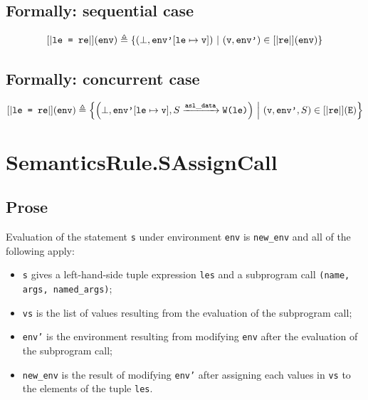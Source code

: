 \documentclass{book}
\begin{document}
\begin{formal}
  \subsection{Formally: sequential case}
  \begin{align}
    \left[| \texttt{le = re} \right|] (\texttt{env}) \triangleq
      \left\{ \left(\bot, \texttt{env'}[\texttt{le} \mapsto \texttt{v} ]\right) \ \middle|\ {} (\texttt{v}, \texttt{env'}) \in \left[| \texttt{re} \right|] (\texttt{env}) \right\}
    \label{eq:sem-seq-sassign}
  \end{align}

  \subsection{Formally: concurrent case}
  \begin{align}
    \left[| \texttt{le = re} \right|] (\texttt{env}) \triangleq
      \left\{ \left(\bot, \texttt{env'}[\texttt{le} \mapsto \texttt{v} ], S \xrightarrow{\mathtt{asl\_data}} \texttt{W(le)}\right) \ \middle|\ {}
        (\texttt{v}, \texttt{env'}, S) \in \left[| \texttt{re} \right|] (\texttt{E})
      \right\}
    \label{eq:sem-conc-sassign}
  \end{align}
\end{formal}


\section{SemanticsRule.SAssignCall \label{sec:SemanticsRule.SAssignCall}}

    \subsection{Prose}
  Evaluation of the statement \texttt{s} under environment \texttt{env} is
\texttt{new\_env} and all of the following apply:
  \begin{itemize}
  \item \texttt{s} gives a left-hand-side tuple expression \texttt{les} and a subprogram call \texttt{(name, args, named\_args)}; 
  \item \texttt{vs} is the list of values resulting from the evaluation of the subprogram call;
  \item \texttt{env'} is the environment resulting from modifying \texttt{env} after the evaluation of the subprogram call;
  \item \texttt{new\_env} is the result of modifying \texttt{env'} after assigning each values in \texttt{vs} to the elements of the tuple \texttt{les}.
  \end{itemize}
\end{document}
